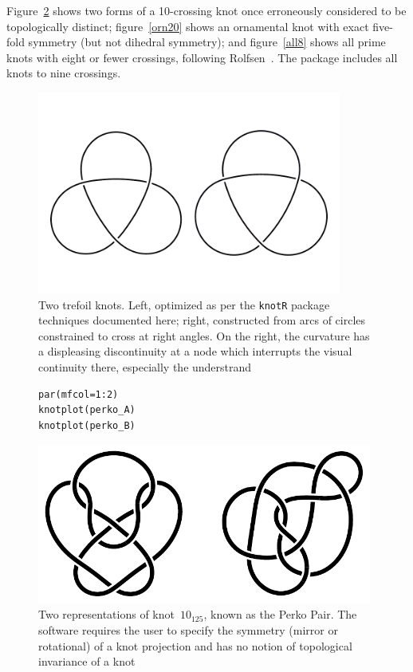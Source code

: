 \documentclass{birkjour}
\theoremstyle{definition}
\theoremstyle{remark}
\numberwithin{equation}{section}
\begin{document}
Figure~\ref{perko_AB} shows two
forms of a 10-crossing knot once erroneously considered to be
topologically distinct; figure~\ref{orn20} shows an ornamental knot
with exact five-fold symmetry (but not dihedral symmetry); and
figure~\ref{all8} shows all prime knots with eight or fewer crossings,
following Rolfsen~\cite{rolfsen1976}.  The package includes all knots
to nine crossings.

\begin{figure}[h]
  \centering  
    \includegraphics[width=10cm]{two_trefoil_knots_post_inkscape.pdf}
    \caption{Two trefoil \label{two_trefoil_knots} knots.  Left,
      optimized as per the {\tt knotR} package techniques documented
      here; right, constructed from arcs of circles constrained to
      cross at right angles.    On the right, the curvature
      has a displeasing discontinuity at a node which interrupts
      the visual continuity there, especially the understrand}
\end{figure}

\begin{figure}[htbp]
  \begin{center}
\begin{verbatim}
par(mfcol=1:2)
knotplot(perko_A)
knotplot(perko_B)
\end{verbatim}
\includegraphics[width=11cm]{knot-perko_A_and_B}  %
\caption{Two representations of knot~$10_{125}$, known as the 
  \label{perko_AB}  Perko Pair.  The software requires the user to
  specify the symmetry (mirror or rotational) of a knot projection and
  has no notion of topological invariance of a knot}
  \end{center}
\end{figure}
\end{document}
